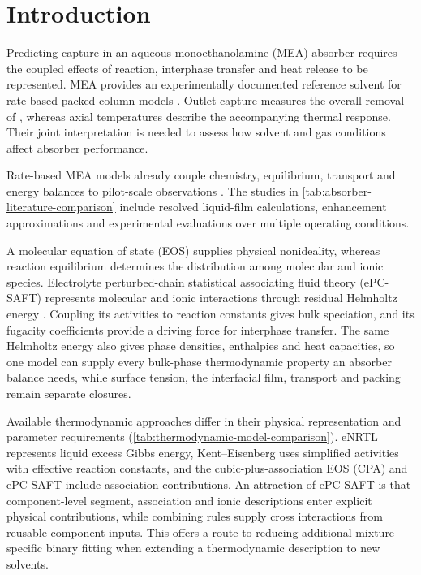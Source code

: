 \section{Introduction}\label{sec:introduction}
Predicting \COtwo{} capture in an aqueous monoethanolamine (MEA) absorber requires the coupled effects of reaction, interphase transfer and heat release to be represented.
MEA provides an experimentally documented reference solvent for rate-based packed-column models \cite{Freguia2003,Mores2012,Zhang2009}.
Outlet capture measures the overall removal of \COtwo, whereas axial temperatures describe the accompanying thermal response.
Their joint interpretation is needed to assess how solvent and gas conditions affect absorber performance.

Rate-based MEA models already couple chemistry, equilibrium, transport and energy balances to pilot-scale observations \cite{Razi2013,Chinen2018,Morgan2018,Morgan2020}.
The studies in \cref{tab:absorber-literature-comparison} include resolved liquid-film calculations, enhancement approximations and experimental evaluations over multiple operating conditions.



A molecular equation of state (EOS) supplies physical nonideality, whereas reaction equilibrium determines the distribution among molecular and ionic species.
Electrolyte perturbed-chain statistical associating fluid theory (ePC-SAFT) represents molecular and ionic interactions through residual Helmholtz energy \cite{Gross2001,Cameretti2005,Bulow2021a}.
Coupling its activities to reaction constants gives bulk speciation, and its fugacity coefficients provide a \COtwo{} driving force for interphase transfer.
The same Helmholtz energy also gives phase densities, enthalpies and heat capacities, so one model can supply every bulk-phase thermodynamic property an absorber balance needs, while surface tension, the interfacial film, transport and packing remain separate closures.

Available thermodynamic approaches differ in their physical representation and parameter requirements (\cref{tab:thermodynamic-model-comparison}).
eNRTL represents liquid excess Gibbs energy, Kent--Eisenberg uses simplified activities with effective reaction constants, and the cubic-plus-association EOS (CPA) and ePC-SAFT include association contributions.
An attraction of ePC-SAFT is that component-level segment, association and ionic descriptions enter explicit physical contributions, while combining rules supply cross interactions from reusable component inputs.
This offers a route to reducing additional mixture-specific binary fitting when extending a thermodynamic description to new solvents.

